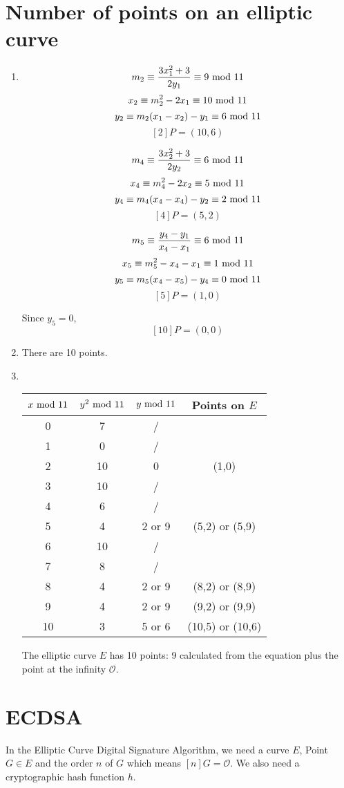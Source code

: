 \documentclass{article}
\renewcommand{\mod}{{\rm\ mod\ }}
\begin{document}
\section{Number of points on an elliptic curve}
\begin{enumerate}
\item
$$m_2\equiv\frac{3x_1^2+3}{2y_1}\equiv9\mod11$$
$$x_2\equiv m_2^2-2x_1\equiv10\mod11$$
$$y_2\equiv m_2(x_1-x_2)-y_1\equiv6\mod11$$
$$[2]P=(10,6)$$

$$m_4\equiv\frac{3x_2^2+3}{2y_2}\equiv6\mod11$$
$$x_4\equiv m_4^2-2x_2\equiv5\mod11$$
$$y_4\equiv m_4(x_4-x_4)-y_2\equiv2\mod11$$
$$[4]P=(5,2)$$

$$m_5\equiv\frac{y_4-y_1}{x_4-x_1}\equiv6\mod11$$
$$x_5\equiv m_5^2-x_4-x_1\equiv1\mod11$$
$$y_5\equiv m_5(x_4-x_5)-y_4\equiv0\mod11$$
$$[5]P=(1,0)$$

Since $y_5=0$,
$$[10]P=(0,0)$$

\item
There are 10 points.

\item \ 
\begin{center}
\begin{tabular}{c|c|c|c}
$x\mod11$ & $y^2\mod11$ & $y\mod11$ & Points on $E$\\\hline
0  & 7  & /\\
1  & 0  & /\\
2  & 10 & 0 & (1,0)\\
3  & 10 & /\\
4  & 6  & / \\
5  & 4  & 2 or 9 & (5,2) or (5,9) \\
6  & 10 & /\\
7  & 8  & /\\
8  & 4  & 2 or 9 & (8,2) or (8,9) \\
9  & 4  & 2 or 9 & (9,2) or (9,9) \\
10 & 3  & 5 or 6 & (10,5) or (10,6) \\
\end{tabular}
\end{center}

The elliptic curve $E$ has 10 points: 9 calculated from the
equation plus the point at the infinity $\mathcal{O}$.

\end{enumerate}

\section{ECDSA}
In the Elliptic Curve Digital Signature Algorithm, we need a curve $E$, Point $G\in E$ and the order $n$ of $G$ which means $[n]G=\mathcal{O}$. We also need a cryptographic hash function $h$.\\
\end{document}
